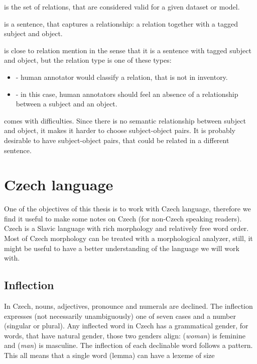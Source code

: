  is the set of relations, that are considered valid for a given dataset or model.

 is a sentence, that captures a relationship: a relation together with a tagged subject and object.

 is close to relation mention in the sense that it is a sentence with tagged subject and object, but the relation type is one of these types: 
\begin{itemize}
\item {} - human annotator would classify a relation, that is not in inventory.
\item {} - in this case, human annotators should feel an absence of a relationship between a subject and an object. 

\end{itemize}

 comes with difficulties. Since there is no semantic relationship between subject and object, it makes it harder to choose subject-object pairs. It is probably desirable to have subject-object pairs, that could be related in a different sentence.

 

 


\section{Czech language}
One of the objectives of this thesis is to work with Czech language, therefore we find it useful to make some notes on Czech (for non-Czech speaking readers). Czech is a Slavic language with rich morphology and relatively free word order. Most of Czech morphology can be treated with a morphological analyzer, still, it might be useful to have a better understanding of the language we will work with.

\subsection{Inflection}
In Czech, nouns, adjectives, pronounce and numerals are declined. The inflection expresses (not necessarily unambiguously) one of seven cases and a number (singular or plural). Any inflected word in Czech has a grammatical gender, for words, that have natural gender, those two genders align:  (\textit{woman}) is feminine and  (\textit{man}) is masculine. The inflection of each declinable word follows a pattern. This all means that a single word (lemma) can have a lexeme of size 

